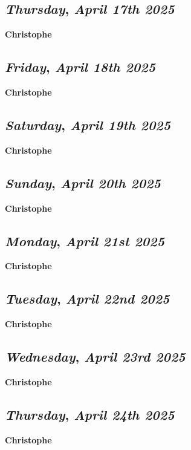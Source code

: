 \def\day{\textit{April 17th 2025}}
\def\weekday{\textit{Thursday}}
\subsection*{\weekday, \day}
\textbf {Christophe}

\def\day{\textit{April 18th 2025}}
\def\weekday{\textit{Friday}}
\subsection*{\weekday, \day}
\textbf {Christophe}

\def\day{\textit{April 19th 2025}}
\def\weekday{\textit{Saturday}}
\subsection*{\weekday, \day}
\textbf {Christophe}

\def\day{\textit{April 20th 2025}}
\def\weekday{\textit{Sunday}}
\subsection*{\weekday, \day}
\textbf {Christophe}

\def\day{\textit{April 21st 2025}}
\def\weekday{\textit{Monday}}
\subsection*{\weekday, \day}
\textbf {Christophe}

\def\day{\textit{April 22nd 2025}}
\def\weekday{\textit{Tuesday}}
\subsection*{\weekday, \day}
\textbf {Christophe}

\def\day{\textit{April 23rd 2025}}
\def\weekday{\textit{Wednesday}}
\subsection*{\weekday, \day}
\textbf {Christophe}

\def\day{\textit{April 24th 2025}}
\def\weekday{\textit{Thursday}}
\subsection*{\weekday, \day}
\textbf {Christophe}

\def\day{\textit{April 25th 2025}}
\def\weekday{\textit{Friday}}
